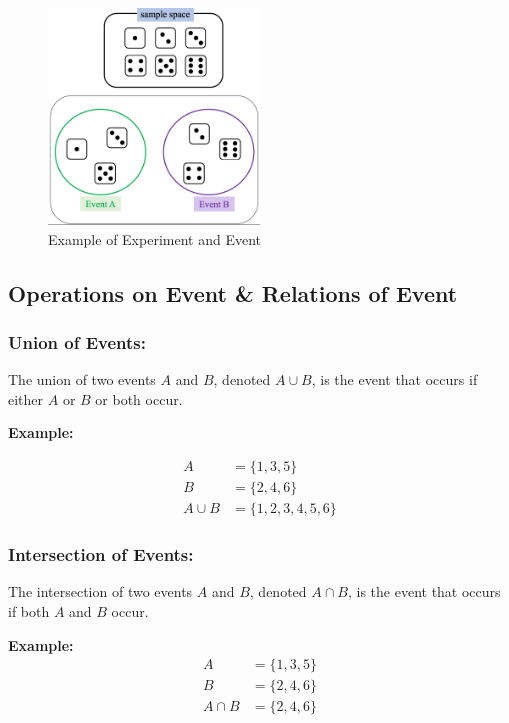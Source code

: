 \documentclass{article}
\begin{document}
\begin{figure}[h]
    \centering
    \includegraphics[width=0.5\textwidth]{images/image1.png}
    \caption{Example of Experiment and Event}
    \label{fig:experiment-event}
\end{figure}

\subsection*{Operations on Event \& Relations of Event}

\subsubsection*{Union of Events:}
The union of two events $A$ and $B$, denoted $A \cup B$, is the event that occurs if either $A$ or $B$ or both occur.

\textbf{Example:}

\begin{align*}
    A &= \{1, 3, 5\} \\
    B &= \{2, 4, 6\} \\
    A \cup B &= \{1, 2, 3, 4, 5, 6\}
\end{align*}


\subsubsection*{Intersection of Events:}
The intersection of two events $A$ and $B$, denoted $A \cap B$, is the event that occurs if both $A$ and $B$ occur.

\textbf{Example:}
\begin{align*}
    A &= \{1, 3, 5\} \\
    B &= \{2, 4, 6\} \\
    A \cap B &= \{2, 4, 6\}
\end{align*}
\end{document}
